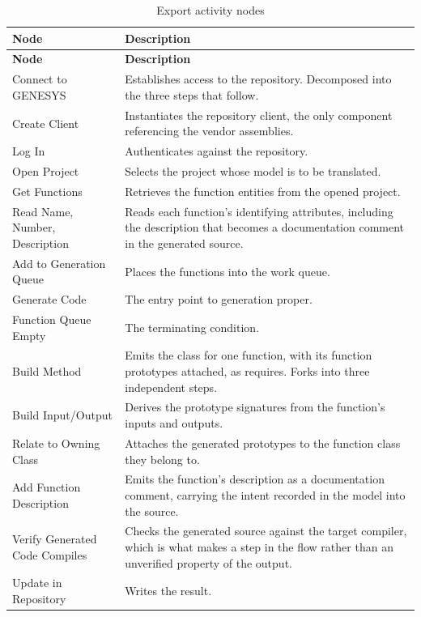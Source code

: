 \begin{longtable}{L{0.30\textwidth}L{0.62\textwidth}}
	\caption{Export activity nodes}\label{tab:export-nodes}\\
	\toprule
	\textbf{Node} & \textbf{Description} \\
	\midrule
	\endfirsthead
	\toprule
	\textbf{Node} & \textbf{Description} \\
	\midrule
	\endhead

	Connect to GENESYS & Establishes access to the repository. Decomposed into the
	three steps that follow. \\
	\addlinespace
	Create Client & Instantiates the repository client, the only component
	referencing the vendor assemblies. \\
	\addlinespace
	Log In & Authenticates against the repository. \\
	\addlinespace
	Open Project & Selects the project whose model is to be translated. \\
	\addlinespace
	Get Functions & Retrieves the function entities from the opened project. \\
	\addlinespace
	Read Name, Number, Description & Reads each function's identifying attributes,
	including the description that becomes a documentation comment in the generated
	source. \\
	\addlinespace
	Add to Generation Queue & Places the functions into the work queue. \\
	\addlinespace
	Generate Code & The entry point to generation proper. \\
	\addlinespace
	Function Queue Empty & The terminating condition. \\
	\addlinespace
	Build Method & Emits the class for one function, with its function prototypes
	attached, as  requires. Forks into three independent steps. \\
	\addlinespace
	Build Input/Output & Derives the prototype signatures from the function's
	inputs and outputs. \\
	\addlinespace
	Relate to Owning Class & Attaches the generated prototypes to the function
	class they belong to. \\
	\addlinespace
	Add Function Description & Emits the function's description as a documentation
	comment, carrying the intent recorded in the model into the source. \\
	\addlinespace
	Verify Generated Code Compiles & Checks the generated source against the
	target compiler, which is what makes  a step in the flow rather than
	an unverified property of the output. \\
	\addlinespace
	Update in Repository & Writes the result. \\
	\bottomrule
\end{longtable}

